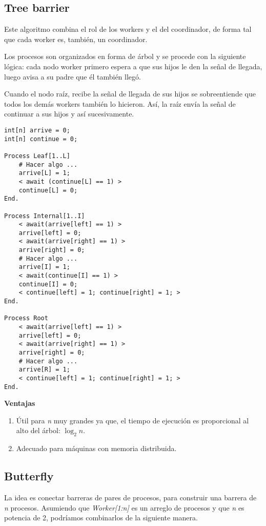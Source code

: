 \documentclass[a4paper, 11pt]{book}
\begin{document}
\subsection{Tree barrier}
Este algoritmo combina el rol de los workers y el del coordinador, de forma tal que cada worker es, también, un coordinador.

Los procesos son organizados en forma de árbol y se procede con la siguiente lógica: cada nodo worker primero espera a que sus hijos le den la señal de llegada, luego avisa a su padre que él también llegó.

Cuando el nodo raíz, recibe la señal de llegada de sus hijos se sobreentiende que todos los demás workers también lo hicieron. Así, la raíz envía la señal de continuar a sus hijos y así sucesivamente.

\begin{lstlisting}
int[n] arrive = 0;
int[n] continue = 0;
    
Process Leaf[1..L]
    # Hacer algo ...
    arrive[L] = 1;
    < await (continue[L] == 1) >
    continue[L] = 0;
End.
    
Process Internal[1..I]
    < await(arrive[left] == 1) >
    arrive[left] = 0;
    < await(arrive[right] == 1) >
    arrive[right] = 0;
    # Hacer algo ...
    arrive[I] = 1;
    < await(continue[I] == 1) >
    continue[I] = 0;
    < continue[left] = 1; continue[right] = 1; >
End.
    
Process Root
    < await(arrive[left] == 1) >
    arrive[left] = 0;
    < await(arrive[right] == 1) >
    arrive[right] = 0;
    # Hacer algo ...
    arrive[R] = 1;
    < continue[left] = 1; continue[right] = 1; >
End.
\end{lstlisting}

\textbf{Ventajas}
\begin{enumerate}
    \item Útil para \emph{n} muy grandes ya que, el tiempo de ejecución es proporcional al alto del árbol: $\log_2n$.
    \item Adecuado para máquinas con memoria distribuida.
\end{enumerate}

\subsection{Butterfly}
La idea es conectar barreras de pares de procesos, para construir una barrera de \emph{n} procesos. Asumiendo que \emph{Worker[1:n]} es un arreglo de procesos y que \emph{n} es potencia de 2, podríamos combinarlos de la siguiente manera.
\end{document}
